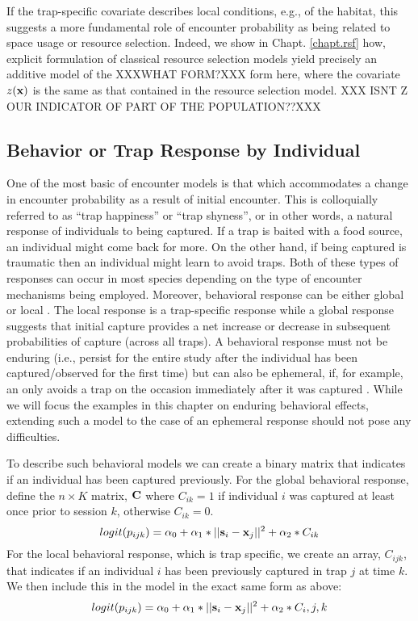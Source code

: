 If the trap-specific covariate describes local conditions, e.g., of
the habitat, this suggests a more fundamental role of encounter
probability as being related to space usage or resource
selection. Indeed, we show in Chapt. \ref{chapt.rsf} how, explicit
formulation of classical 
resource selection models yield precisely an additive model of the XXXWHAT FORM?XXX
form here, where the covariate $z({\bf x})$ is the same as that
contained in the resource selection model. XXX ISNT Z OUR INDICATOR OF PART OF THE POPULATION??XXX 









\subsection{Behavior or Trap Response by Individual}

One of the most basic of encounter models is that which accommodates a
change in encounter probability as a result of initial encounter.
This is colloquially referred to as ``trap happiness'' or ``trap shyness'', or in other words, a
natural response of individuals to being captured. If a trap is baited
with a food source, an individual might come back for
more. On the other hand, if being captured is traumatic then an
individual might learn to avoid traps. Both of these types of
responses can occur in most species depending on the type of encounter
mechanisms being employed. Moreover, behavioral response can be either
global \citep{gardner_etal:2010} or local \citep{royle_etal:2009jwm}.
The local response is a trap-specific response 
while a global response suggests that
initial capture provides a net increase or decrease in subsequent probabilities of capture (across all
traps). A behavioral response must not be enduring (i.e., persist for the entire study after the individual has been captured/observed for the first time) but can also be ephemeral, if, for example, an only avoids a trap on the occasion immediately after it was captured \citep{royle:2008B, yang_chao:2005}. While we will focus the examples in this chapter on enduring behavioral effects, extending such a model to the case of an ephemeral response should not pose any difficulties. 

To describe such behavioral models we can create a binary matrix that indicates
if an individual has been captured previously.  For the global
behavioral response, define the $n \times K$ matrix,
${\bf C}$ where $C_{ik} =1$
if individual $i$ was captured at least once prior to session
$k$, otherwise $C_{ik} = 0$.
\[
logit(p_{ijk}) = \alpha_{0} + \alpha_1 *||{\bf s}_{i}-{\bf x}_{j}||^{2} + \alpha_2*C_{ik}
\]
For the local behavioral response, which is trap specific, we create
an array, $C_{ijk}$, that indicates if an individual $i$ has been
previously captured in trap $j$ at time $k$.  We then include this in
the model in the exact same form as above:
\[
logit(p_{ijk}) = \alpha_{0} + \alpha_1*||{\bf s}_{i}-{\bf x}_{j}||^{2} + \alpha_2*C_i,j,k
\]


